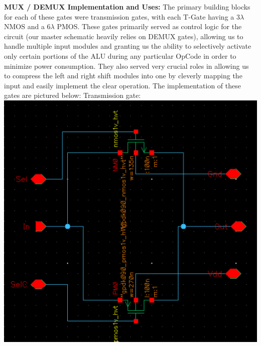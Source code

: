 \documentclass[12pt]{article}
\begin{document}
	\newline \newline
	\textbf{MUX / DEMUX Implementation and Uses:}
	\newline \newline
	The primary building blocks for each of these gates were transmission gates, with each 
	T-Gate having a 3$\lambda$ NMOS and a 6$\lambda$ PMOS. These gates primarily served
	as control logic for the circuit (our master schematic heavily relies on DEMUX gates), 
	allowing us to handle multiple input modules and granting us the ability to selectively 
	activate only certain portions of the ALU during any particular OpCode
	in order to minimize power consumption. They also served very crucial roles in allowing us to
	compress the left and right shift modules into one by cleverly mapping the input and easily 
	implement the clear operation. The implementation of these gates are pictured below:
	\newline \newline
  Transmission gate:\\
  \includegraphics[scale=0.4]{tgate.png}
  \\
\end{document}
